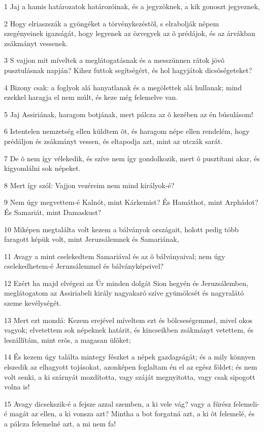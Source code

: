 \par 1 Jaj a hamis határozatok határozóinak, és a jegyzõknek, a kik gonoszt jegyeznek,
\par 2 Hogy elriaszszák a gyöngéket a törvénykezéstõl, s elrabolják népem szegényeinek igazságát, hogy legyenek az özvegyek az õ prédájok, és az árvákban zsákmányt vessenek.
\par 3 S vajjon mit míveltek a meglátogatásnak és a messzünnen rátok jövõ pusztulásnak napján? Kihez futtok segítségért, és hol hagyjátok dicsõségeteket?
\par 4 Bizony csak: a foglyok alá hanyatlanak és a megölettek alá hullanak; mind ezekkel haragja el nem múlt, és keze még felemelve van.
\par 5 Jaj Assiriának, haragom botjának, mert pálcza az õ kezében az én búsulásom!
\par 6 Istentelen nemzetség ellen küldtem õt, és haragom népe ellen rendelém, hogy prédáljon és zsákmányt vessen, és eltapodja azt, mint az utczák sarát.
\par 7 De õ nem így vélekedik, és szíve nem így gondolkozik, mert õ pusztítani akar, és kigyomlálni sok népeket.
\par 8 Mert így szól: Vajjon vezéreim nem mind királyok-é?
\par 9 Nem úgy megvettem-é Kalnót, mint Kárkemist? És Hamáthot, mint Arphádot? És Samariát, mint Damaskust?
\par 10 Miképen megtalálta volt kezem a bálványok országait, holott pedig több faragott képük volt, mint Jeruzsálemnek és Samariának,
\par 11 Avagy a mint cselekedtem Samariával és az õ bálványaival; nem úgy cselekedhetem-é Jeruzsálemmel és bálványképeivel?
\par 12 Ezért ha majd elvégezi az Úr minden dolgát Sion hegyén és Jeruzsálemben, meglátogatom az Assiriabeli király nagyakaró szíve gyümölcsét és nagyralátó szeme kevélységét.
\par 13 Mert ezt mondá: Kezem erejével míveltem ezt és bölcseségemmel, mivel okos vagyok; elvetettem sok népeknek határit, és kincseikben zsákmányt vetettem, és leszállítám, mint erõs, a magasan ülõket;
\par 14 És kezem úgy találta mintegy fészket a népek gazdagságát; és a mily könnyen elszedik az elhagyott tojásokat, azonképen foglaltam én el az egész földet; és nem volt senki, a ki szárnyát mozdította, vagy száját megnyitotta, vagy csak sipogott volna is!
\par 15 Avagy dicsekszik-é a fejsze azzal szemben, a ki vele vág? vagy a fûrész felemeli-é magát az ellen, a ki vonsza azt? Mintha a bot forgatná azt, a ki õt felemelé, és a pálcza felemelné azt, a mi nem fa!
